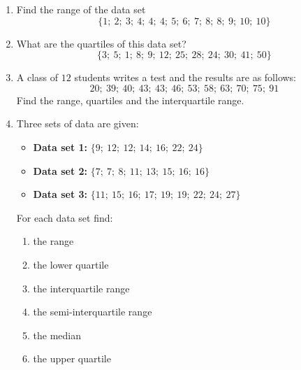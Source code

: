 \begin{exercises}{}{
  \begin{enumerate}[noitemsep, label=\textbf{\arabic*}.]
\item Find the range of the data set
    \begin{equation*}
      \{1;\ 2;\ 3;\ 4;\ 4;\ 4;\ 5;\ 6;\ 7;\ 8;\ 8;\ 9;\ 10;\ 10\}
    \end{equation*}
\item What are the quartiles of this data set?
    \begin{equation*}
      \{3;\ 5;\ 1;\ 8;\ 9;\ 12;\ 25;\ 28;\ 24;\ 30;\ 41;\ 50\}
    \end{equation*}
  \item A class of $12$ students writes a test and the results are as
    follows:
    \begin{equation*}
      20;\ 39;\ 40;\ 43;\ 43;\ 46;\ 53;\ 58;\ 63;\ 70;\ 75;\ 91
    \end{equation*}
    Find the range, quartiles and the interquartile range.
 \item Three sets of data are given:
    \begin{itemize}  
    \item \textbf{Data set 1:} $\{9;\ 12;\ 12;\ 14;\ 16;\ 22;\ 24\}$
    \item \textbf{Data set 2:} $\{7;\ 7;\ 8;\ 11;\ 13;\ 15;\ 16;\ 16\}$
    \item \textbf{Data set 3:} $\{11;\ 15;\ 16;\ 17;\ 19;\ 19;\ 22;\ 24;\ 27\}$
    \end{itemize}
    For each data set find:
    \begin{enumerate}[noitemsep, label=\textbf{(\alph*)} ]
    \item the range
    \item the lower quartile
    \item the interquartile range
    \item the semi-interquartile range
    \item the median
    \item the upper quartile
    \end{enumerate}
  \end{enumerate}
}
\end{exercises}


